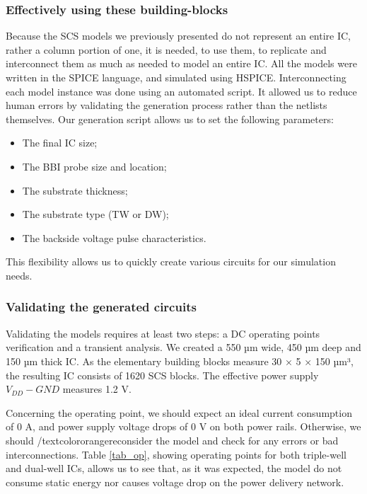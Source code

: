 		\subsubsection{Effectively using these building-blocks}
		Because the SCS models we previously presented do not represent an entire IC, rather a column portion of one, it is needed, to use them, to replicate and interconnect them as much as needed to model an entire IC.
		All the models were written in the SPICE language, and simulated using HSPICE.
		Interconnecting each model instance was done using an automated script.
		It allowed us to reduce human errors by validating the generation process rather than the netlists themselves.
		Our generation script allows us to set the following parameters:
		\begin{itemize}
			\item The final IC size;
			\item The BBI probe size and location;
			\item The substrate thickness;
			\item The substrate type (TW or DW);
			\item The backside voltage pulse characteristics.
		\end{itemize}
		This flexibility allows us to quickly create various circuits for our simulation needs.
		
		\subsubsection{Validating the generated circuits}
		Validating the models requires at least two steps: a DC operating points verification and a transient analysis.
		We created a 550 µm wide, 450 µm deep and 150 µm thick IC.
		As the elementary building blocks measure 30 × 5 × 150 µm³, the resulting IC consists of 1620 SCS blocks.
		The effective power supply $V_{DD} - GND$ measures 1.2 V.
		
		Concerning the operating point, we should expect an ideal current consumption of 0 A, and power supply voltage drops of 0 V on both power rails.
		Otherwise, we should /textcolor{orange}{reconsider} the model and check for any errors or bad interconnections.
		Table \ref{tab_op}, showing operating points for both triple-well and dual-well ICs, allows us to see that, as it was expected, the model do not consume static energy nor causes voltage drop on the power delivery network.
		
